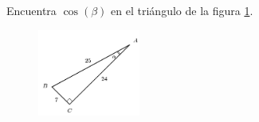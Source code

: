 \question[15] Encuentra $\cos(\beta)$ en el triángulo de la figura \ref{fig:functrig10}.
\begin{figure}[H]
    \begin{center}
        \includegraphics[width=0.3\textwidth]{../images/functrig10.png}
    \end{center}
    \caption{}
    \label{fig:functrig10}
\end{figure}
